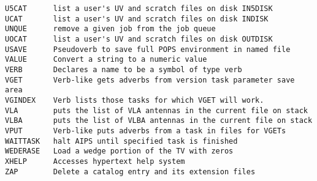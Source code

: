 \begin{verbatim}
U5CAT      list a user's UV and scratch files on disk IN5DISK
UCAT       list a user's UV and scratch files on disk INDISK
UNQUE      remove a given job from the job queue
UOCAT      list a user's UV and scratch files on disk OUTDISK
USAVE      Pseudoverb to save full POPS environment in named file
VALUE      Convert a string to a numeric value
VERB       Declares a name to be a symbol of type verb
VGET       Verb-like gets adverbs from version task parameter save area
VGINDEX    Verb lists those tasks for which VGET will work.
VLA        puts the list of VLA antennas in the current file on stack
VLBA       puts the list of VLBA antennas in the current file on stack
VPUT       Verb-like puts adverbs from a task in files for VGETs
WAITTASK   halt AIPS until specified task is finished
WEDERASE   Load a wedge portion of the TV with zeros
XHELP      Accesses hypertext help system
ZAP        Delete a catalog entry and its extension files
\end{verbatim}\eve


